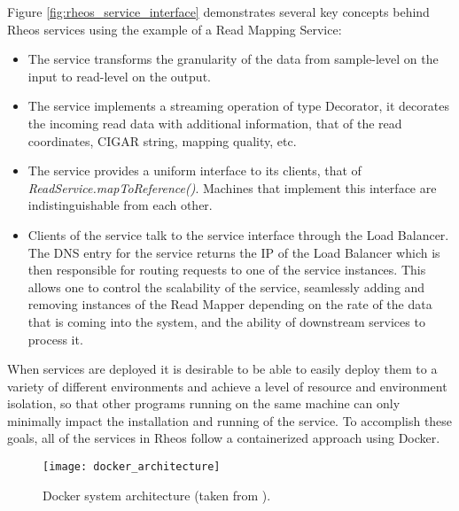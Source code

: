 Figure \ref{fig:rheos_service_interface} demonstrates several key concepts behind Rheos services using the example of a Read Mapping Service:

\begin{itemize}
    \item The service transforms the granularity of the data from sample-level on the input to read-level on the output. 
    \item The service implements a streaming operation of type Decorator, it decorates the incoming read data with additional information, that of the read coordinates, CIGAR string, mapping quality, etc. 
    \item The service provides a uniform interface to its clients, that of \emph{ReadService.mapToReference()}. Machines that implement this interface are indistinguishable from each other. 
    \item Clients of the service talk to the service interface through the Load Balancer. The DNS entry for the service returns the IP of the Load Balancer which is then responsible for routing requests to one of the service instances. This allows one to control the scalability of the service, seamlessly adding and removing instances of the Read Mapper depending on the rate of the data that is coming into the system, and the ability of downstream services to process it.  
\end{itemize}

When services are deployed it is desirable to be able to easily deploy them to a variety of different environments and achieve a level of resource and environment isolation, so that other programs running on the same machine can only minimally impact the installation and running of the service. To accomplish these goals, all of the services in Rheos follow a containerized approach using Docker\autocite{merkel2014docker}.

\begin{figure}[H]
    \texttt{[image: docker\_architecture]}
    \centering
    \caption {Docker system architecture (taken from \autocite{dockerdoc}).}
    \label{fig:docker_architecture}
\end{figure}

